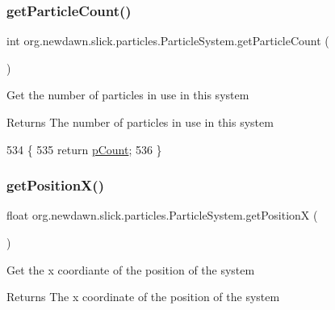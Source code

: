 \subsubsection{\texorpdfstring{get\+Particle\+Count()}{getParticleCount()}}
{\footnotesize\ttfamily int org.\+newdawn.\+slick.\+particles.\+Particle\+System.\+get\+Particle\+Count (\begin{DoxyParamCaption}{ }\end{DoxyParamCaption})\hspace{0.3cm}{\ttfamily [inline]}}

Get the number of particles in use in this system

\begin{DoxyReturn}{Returns}
The number of particles in use in this system 
\end{DoxyReturn}

\begin{DoxyCode}
534                                   \{
535         \textcolor{keywordflow}{return} \mbox{\hyperlink{classorg_1_1newdawn_1_1slick_1_1particles_1_1_particle_system_ad811064cd2cca4105b49ad71a47a72aa}{pCount}};
536     \}
\end{DoxyCode}
\mbox{\label{classorg_1_1newdawn_1_1slick_1_1particles_1_1_particle_system_a19afb04e1ce4b7f39ef5d55beec21b94}} 
\subsubsection{\texorpdfstring{get\+Position\+X()}{getPositionX()}}
{\footnotesize\ttfamily float org.\+newdawn.\+slick.\+particles.\+Particle\+System.\+get\+PositionX (\begin{DoxyParamCaption}{ }\end{DoxyParamCaption})\hspace{0.3cm}{\ttfamily [inline]}}

Get the x coordiante of the position of the system

\begin{DoxyReturn}{Returns}
The x coordinate of the position of the system 
\end{DoxyReturn}

